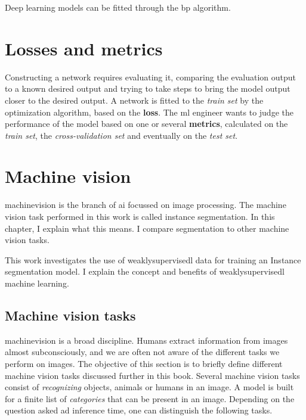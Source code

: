 Deep learning models can be fitted through the \acrfull{bp} algorithm. 

\section{Losses and metrics}

Constructing a network requires evaluating it, comparing the evaluation output to a known desired output and trying to take steps to bring the model output closer to the desired output. 
A network is fitted to the \textit{train set} by the optimization algorithm, based on the \textbf{loss}.
The \acrshort{ml} engineer wants to judge the performance of the model based on one or several \textbf{metrics}, calculated on the \textit{train set}, the \textit{cross-validation set} and eventually on the \textit{test set}.

\section{Machine vision}

\Gls{machinevision} is the branch of \Gls{ai} focussed on image processing.
The machine vision task performed in this work is called instance \Gls{segmentation}.
In this chapter, I explain what this means. 
I compare segmentation to other machine vision tasks.

This work investigates the use of \Gls{weaklysupervisedl} data for training an Instance segmentation model. 
I explain the concept and benefits of \Gls{weaklysupervisedl} machine learning.

\subsection{Machine vision tasks \label{sec:machinevisiontasks}}

\Gls{machinevision} is a broad discipline. 
Humans extract information from images almost subconsciously, and we are often not aware of the different tasks we perform on images.
The objective of this section is to briefly define different machine vision tasks discussed further in this book. 
Several machine vision tasks consist of \textit{recognizing} objects, animals or humans in an image.
A model is built for a finite list of \textit{categories} that can be present in an image.
Depending on the question asked ad inference time, one can distinguish the following tasks.

